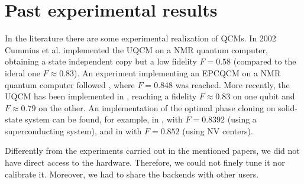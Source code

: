 \section{Past experimental results}
In the literature there are some experimental realization of QCMs. 
In 2002 Cummins et al. \cite{UQCMwithNMR} implemented the UQCM on a NMR quantum computer, obtaining a state independent copy but a low fidelity $F=0.58$ (compared to the ideral one $F \approx 0.83$).
An experiment implementing an EPCQCM on a NMR quantum computer followed \cite{EPCQCMwithNMR}, where $F=0.848$ was reached.
More recently, the UQCM has been implemented in \cite{UQCMwithSuperconducting}, reaching a fidelity $F\approx 0.83$ on one qubit and $F\approx 0.79$ on the other.
An implementation of the optimal phase cloning on solid-state system can be found, for example, in \cite{PCQCMwithSuperconducting}, with $F=0.8392$ (using a superconducting system), and in \cite{PCQCMwithNV} with $F=0.852$ (using NV centers).

Differently from the experiments carried out in the mentioned papers, we did not have direct access to the hardware. 
Therefore, we could not finely tune it nor calibrate it. Moreover, we had to share the backends with other users.
